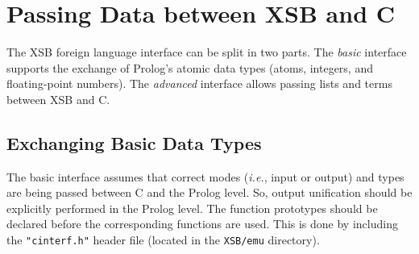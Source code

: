\section{Passing Data between XSB and C}

The XSB foreign language interface can be split in two parts.
The \emph{basic} interface supports the exchange of Prolog's 
atomic data types (atoms, integers, and floating-point numbers). 
The \emph{advanced} interface allows passing lists and terms between XSB
and C.

\subsection{Exchanging Basic Data Types}
The basic interface assumes that correct modes ({\it i.e.}, input or
output) and types are being passed between C and the Prolog level.  So,
output unification should be explicitly performed in the Prolog level.  The
function prototypes should be declared before the corresponding functions
are used.  This is done by including the {\tt "cinterf.h"} header file
(located in the {\tt XSB/emu} directory).

